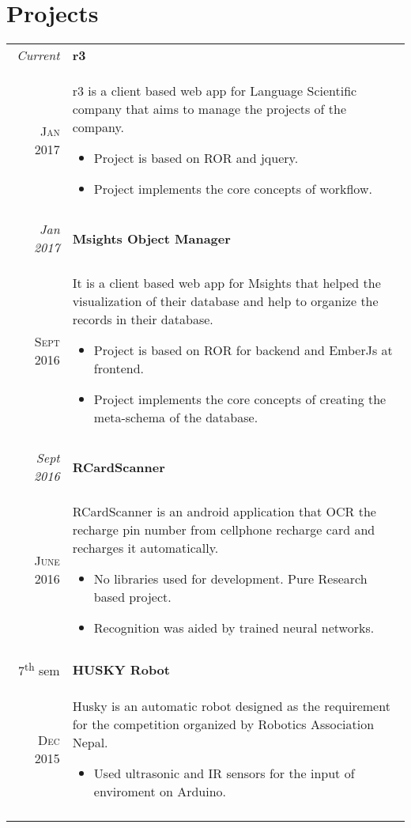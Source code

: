 \documentclass[a4paper,10pt]{article}
\begin{document}
\section{Projects}
\begin{tabular}{r|p{11cm}}

\emph{Current} & \textbf{r3}\\ \textsc{Jan 2017} & \small{r3 is a client based web app for Language Scientific company that aims to manage the projects of the company. 
\footnotesize{
\begin{itemize}
\item Project is based on ROR and jquery.
\item Project implements the core concepts of workflow.
\end{itemize}
}}\\\multicolumn{2}{c}{} \\

\emph{Jan 2017} & \textbf{Msights Object Manager}\\ \textsc{Sept 2016} & \small{It is a client based web app for Msights that helped the visualization of their database and help to organize the records in their database. 
\footnotesize{
\begin{itemize}
\item Project is based on ROR for backend and EmberJs at frontend.
\item Project implements the core concepts of creating the meta-schema of the database.
\end{itemize}
}}\\\multicolumn{2}{c}{} \\

\emph{Sept 2016} & \textbf{RCardScanner}\\ \textsc{June 2016} & \small{RCardScanner is an android application that OCR the recharge pin number
from cellphone recharge card and recharges it automatically.
\footnotesize{
\begin{itemize}
\item No libraries used for development. Pure Research based project.
\item Recognition was aided by trained neural networks.
\end{itemize}
}}\\\multicolumn{2}{c}{} \\

7\textsuperscript{th} sem & \textbf{HUSKY Robot}\\ \textsc{Dec 2015} & \small{Husky is an automatic robot designed as the requirement for the competition organized by Robotics Association Nepal.
\footnotesize{
\begin{itemize}
\item Used ultrasonic and IR sensors for the input of enviroment on Arduino.
\end{itemize}
}}\\\multicolumn{2}{c}{} \\


\end{tabular}
\end{document}
